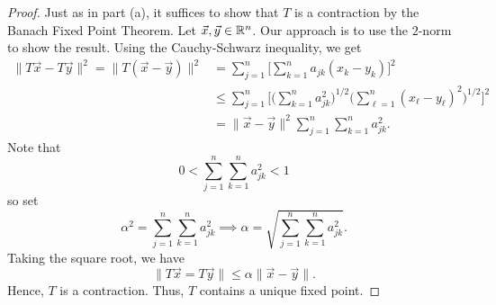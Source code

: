 \documentclass[a4paper]{article}
\begin{document}
\begin{enumerate}
        \begin{proof}
        Just as in part (a), it suffices to show that \( T  \) is a contraction by the Banach Fixed Point Theorem. Let \( \vec{ x } , \vec{ y }  \in \mathbb{R}^{n} \). Our approach is to use the \( 2 \)-norm to show the result. Using the Cauchy-Schwarz inequality, we get 
        \begin{align*}
            \|T \vec{ x }  - T \vec{ y } \|^{2} = \|T(\vec{ x }  - \vec{ y } )\|^{2}   
                                                   &= \sum_{ j=1  }^{ n } \Big[\sum_{ k=1  }^{ n } {a}_{jk} ({x}_{k} - {y}_{k})\Big]^{2} \\ 
                                                   &\leq \sum_{ j=1  }^{ n } \Big[ \Big(  \sum_{ k=1  }^{ n } {a}_{jk}^{2}  \Big)^{1/2} \Big(  \sum_{ \ell = 1  }^{ n  } ({x}_{\ell} - {y}_{\ell})^{2} \Big)^{1/2} \Big]^{2} \\
                                                   &= \|\vec{ x } - \vec{ y } \|^{2} \sum_{ j=1  }^{ n } \sum_{ k=1  }^{ n } {a}_{jk}^{2}.
        \end{align*}
        Note that 
        \[ 0 < \sum_{ j=1  }^{ n } \sum_{ k=1  }^{ n } {a}_{jk}^{2} < 1  \]
        so set 
        \[  \alpha^{2} = \sum_{ j=1  }^{ n } \sum_{ k=1  }^{ n } {a}_{jk}^{2} \implies \alpha = \sqrt{ \sum_{ j=1  }^{ n } \sum_{ k=1  }^{ n } {a}_{jk}^{2} }.  \]
        Taking the square root, we have 
        \[  \|T \vec{ x }  = T \vec{ y } \| \leq \alpha \|\vec{ x } - \vec{ y } \|. \]
        Hence, \( T  \) is a contraction. Thus, \( T  \) contains a unique fixed point. 
        \end{proof}
\end{enumerate} 
\end{document}
